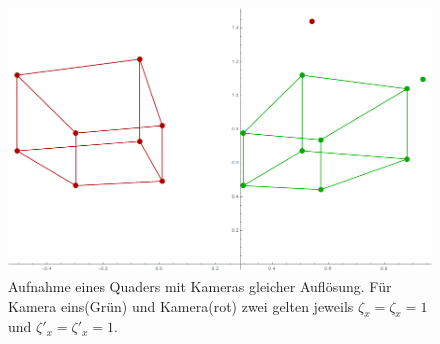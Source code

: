 


\begin{figure}[!htb]
	\centering
	\includegraphics[width=.8\linewidth]{images/Rectification_one_same_Solutions.png}
	\caption[virtuelle Aufnahme eines Quaders für die Rektifizierung]{Aufnahme eines Quaders mit Kameras gleicher Auflösung. Für Kamera eins(Grün) und Kamera(rot) zwei gelten jeweils \ensuremath{\zeta_x = \zeta_x =1} und \ensuremath{\zeta'_x = \zeta'_x =1}.}
	\label{fig:RectOriginal} 
\end{figure}
\pagebreak


